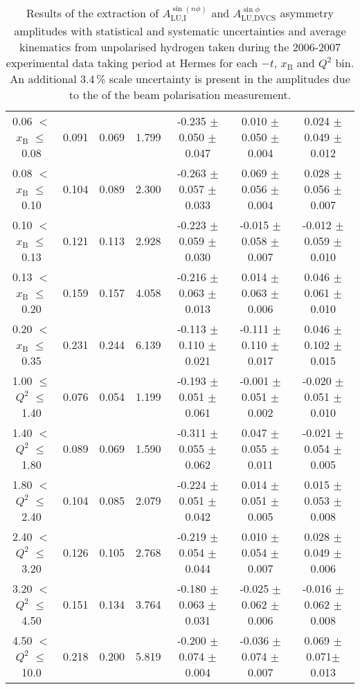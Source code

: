 \begin{table}[width=15cm]
\begin{center}
{\begin{tabular}{|c|c|c|c|c|c|c|}
0.06 $<$ $x_{\textrm{B}}$ $\leqslant$ 0.08 &  0.091 & 0.069 &  1.799 &  -0.235  $\pm$  0.050  $\pm$   0.047 &
0.010 $\pm$  0.050  $\pm$   0.004 & 0.024 $\pm$   0.049  $\pm$   0.012\\
0.08 $<$ $x_{\textrm{B}}$ $\leqslant$ 0.10 &  0.104 & 0.089 &  2.300 &  -0.263 $\pm$  0.057  $\pm$   0.033 &
0.069 $\pm$   0.056  $\pm$   0.004 & 0.028  $\pm$  0.056  $\pm$   0.007\\
0.10 $<$ $x_{\textrm{B}}$ $\leqslant$ 0.13 &  0.121 &  0.113 &  2.928 &  -0.223  $\pm$  0.059   $\pm$  0.030 & 
-0.015  $\pm$  0.058  $\pm$   0.007 & -0.012  $\pm$  0.059  $\pm$   0.010\\
0.13 $<$ $x_{\textrm{B}}$ $\leqslant$ 0.20 &  0.159 & 0.157 &  4.058&  -0.216  $\pm$  0.063  $\pm$   0.013 &
0.014  $\pm$  0.063  $\pm$   0.006 & 0.046  $\pm$  0.061  $\pm$   0.010 \\
0.20 $<$ $x_{\textrm{B}}$ $\leqslant$ 0.35 &  0.231 & 0.244 &  6.139 &  -0.113 $\pm$ 0.110  $\pm$   0.021 &
-0.111  $\pm$  0.110 $\pm$    0.017 & 0.046  $\pm$  0.102  $\pm$  0.015\\
\hline
1.00 $\leqslant$ $Q^{2}$ $\leqslant$ 1.40 &  0.076 & 0.054  & 1.199 &  -0.193  $\pm$  0.051  $\pm$   0.061 &
-0.001 $\pm$   0.051  $\pm$   0.002 & -0.020  $\pm$  0.051   $\pm$  0.010 \\
1.40 $<$ $Q^{2}$ $\leqslant$ 1.80 &  0.089 & 0.069 &  1.590 &  -0.311 $\pm$  0.055  $\pm$   0.062 &
0.047  $\pm$  0.055  $\pm$   0.011 & -0.021 $\pm$   0.054  $\pm$   0.005\\
1.80 $<$ $Q^{2}$ $\leqslant$ 2.40 &  0.104 & 0.085 &  2.079 &  -0.224 $\pm$   0.051  $\pm$   0.042 &
0.014 $\pm$   0.051  $\pm$   0.005 & 0.015  $\pm$  0.053  $\pm$   0.008\\
2.40 $<$ $Q^{2}$ $\leqslant$ 3.20 &  0.126 & 0.105  & 2.768 &  -0.219 $\pm$   0.054  $\pm$   0.044 &
0.010  $\pm$  0.054 $\pm$    0.007 & 0.028   $\pm$ 0.049  $\pm$   0.006\\
3.20 $<$ $Q^{2}$ $\leqslant$ 4.50 &  0.151 & 0.134 &  3.764 &  -0.180 $\pm$   0.063  $\pm$   0.031 &
-0.025  $\pm$  0.062 $\pm$    0.006 & -0.016 $\pm$   0.062  $\pm$   0.008\\
4.50 $<$ $Q^{2}$ $\leqslant$ 10.0 &  0.218 & 0.200 &  5.819 &  -0.200  $\pm$  0.074 $\pm$    0.004 &
-0.036  $\pm$  0.074  $\pm$   0.007 & 0.069 $\pm$  0.071$ \pm$  0.013\\
\hline
  \end{tabular}
}
 \end{center}
\caption{Results of the extraction of $A_{\textrm{LU,I}}^{\sin(n\phi)}$ and $A_{\textrm{LU,DVCS}}^{\sin \phi}$ asymmetry amplitudes with statistical and systematic uncertainties and average kinematics from unpolarised hydrogen taken during
the 2006-2007 experimental data taking period at H{\sc ermes} for each $-t$, $x_{\textrm{B}}$ and $Q^{2}$ bin.
An additional 3.4\,\% scale uncertainty is present in the amplitudes due to the  of
the beam polarisation measurement.}
\end{table}

